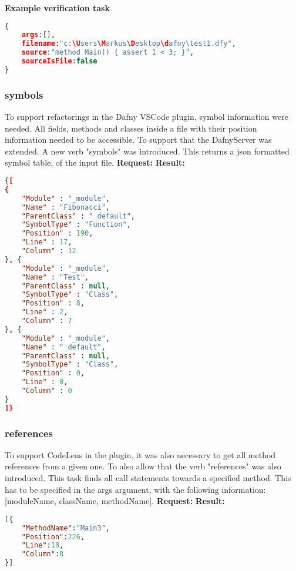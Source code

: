 \textbf{Example verification task}
\begin{lstlisting}[language=json,firstnumber=1]
{
	args:[],
	filename:"c:\Users\Markus\Desktop\dafny\test1.dfy",
	source:"method Main() {	assert 1 < 3; }",
	sourceIsFile:false
}

\end{lstlisting}

\subsubsection{symbols}
To support refactorings in the Dafny VSCode plugin, symbol information were needed. All fields, methods and classes inside a file with their position information needed to be accessible. To support that the DafnyServer was extended. A new verb "symbols" was introduced. This returns a json formatted symbol table, of the input file. 
\newline\newline
\textbf{Request: }
\newline\newline
\textbf{Result: }
\begin{lstlisting}[language=json,firstnumber=1]
{[
{
	"Module" : "_module",
	"Name" : "Fibonacci",
	"ParentClass" : "_default",
	"SymbolType" : "Function",
	"Position" : 190,
	"Line" : 17,
	"Column" : 12
}, {
	"Module" : "_module",
	"Name" : "Test",
	"ParentClass" : null,
	"SymbolType" : "Class",
	"Position" : 8,
	"Line" : 2,
	"Column" : 7
}, {
	"Module" : "_module",
	"Name" : "_default",
	"ParentClass" : null,
	"SymbolType" : "Class",
	"Position" : 0,
	"Line" : 0,
	"Column" : 0
}
]}
\end{lstlisting}

\subsubsection{references}
To support CodeLens in the plugin, it was also necessary to get all method references from a given one. To also allow that the verb "references" was also introduced. This task finds all call statements towards a specified method. This has to be specified in the args argument, with the following information: [moduleName, className, methodName]. 
\newline\newline
\textbf{Request: }
\newline\newline
\textbf{Result: }
\begin{lstlisting}[language=json,firstnumber=1]
[{
	"MethodName":"Main3",
	"Position":226,
	"Line":18,
	"Column":8
}] 
\end{lstlisting}


